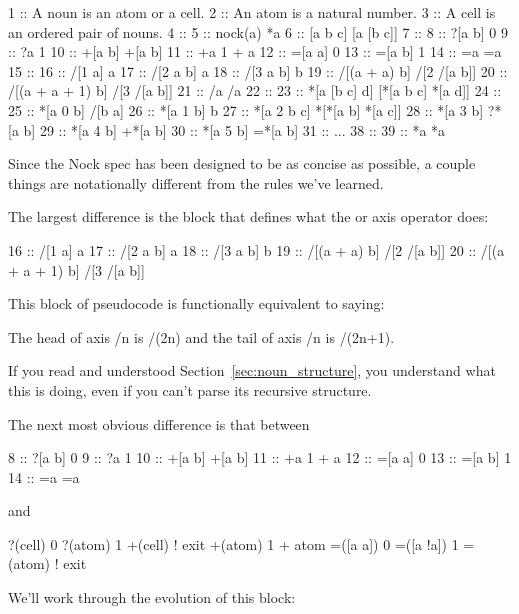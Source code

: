 \begin{code}
1  ::    A noun is an atom or a cell.
2  ::    An atom is a natural number.
3  ::    A cell is an ordered pair of nouns.
4  ::
5  ::    nock(a)          *a
6  ::    [a b c]          [a [b c]]
7  ::
8  ::    ?[a b]           0
9  ::    ?a               1
10 ::    +[a b]           +[a b]
11 ::    +a               1 + a
12 ::    =[a a]           0
13 ::    =[a b]           1
14 ::    =a               =a
15 ::
16 ::    /[1 a]           a
17 ::    /[2 a b]         a
18 ::    /[3 a b]         b
19 ::    /[(a + a) b]     /[2 /[a b]]
20 ::    /[(a + a + 1) b] /[3 /[a b]]
21 ::    /a               /a
22 ::
23 ::    *[a [b c] d]     [*[a b c] *[a d]]
24 ::
25 ::    *[a 0 b]         /[b a]
26 ::    *[a 1 b]         b
27 ::    *[a 2 b c]       *[*[a b] *[a c]]
28 ::    *[a 3 b]         ?*[a b]
29 ::    *[a 4 b]         +*[a b]
30 ::    *[a 5 b]         =*[a b]
31 ::
...
38 ::
39 ::    *a               *a
\end{code}

Since the Nock spec has been designed to be as concise as possible, a couple things are notationally different from the rules we've learned.

The largest difference is the block that defines what the \kode{/} or axis operator does:

\begin{code}
16 ::    /[1 a]           a
17 ::    /[2 a b]         a
18 ::    /[3 a b]         b
19 ::    /[(a + a) b]     /[2 /[a b]]
20 ::    /[(a + a + 1) b] /[3 /[a b]]

\end{code}
This block of pseudocode is functionally equivalent to saying:

The head of axis /n is /(2n) and the tail of axis /n is /(2n+1).

If you read and understood Section~\ref{sec:noun_structure}, you understand what this is doing, even if you can't parse its recursive structure.

The next most obvious difference is that between

\begin{code}
8  ::    ?[a b]           0
9  ::    ?a               1
10 ::    +[a b]           +[a b]
11 ::    +a               1 + a
12 ::    =[a a]           0
13 ::    =[a b]           1
14 ::    =a               =a
\end{code}
and

\begin{code}
?(cell)               0
?(atom)               1
+(cell)               ! exit
+(atom)               1 + atom
=([a a])              0
=([a !a])             1
=(atom)               ! exit
\end{code}
We'll work through the evolution of this block:

